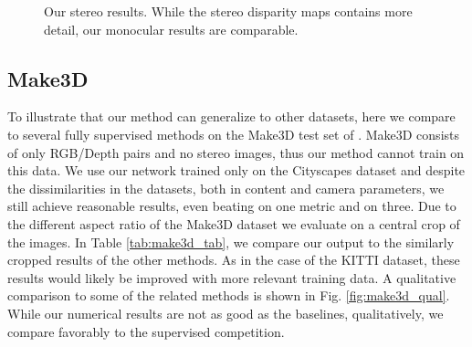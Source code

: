 \documentclass[10pt,twocolumn,letterpaper]{article}
\begin{document}
\begin{figure}[!ht]
  \centering
    \vspace{3pt}
  \caption{Our stereo results. While the stereo disparity maps contains more detail, our monocular results are comparable.}
  \label{fig:stereo_results}
  \vspace{-8pt}
\end{figure}

\subsection{Make3D} 
To illustrate that our method can generalize to other datasets, here we compare to several fully supervised methods on the Make3D test set of \cite{saxena2009make3d}. 
Make3D consists of only RGB/Depth pairs and no stereo images, thus our method cannot train on this data.
We use our network trained only on the Cityscapes dataset and despite the dissimilarities in the datasets, both in content and camera parameters, we still achieve reasonable results, even beating \cite{karsch2014depth} on one metric and \cite{liu2014discrete} on three.
Due to the different aspect ratio of the Make3D dataset we evaluate on a central crop of the images.
In Table \ref{tab:make3d_tab}, we compare our output to the similarly cropped results of the other methods.
As in the case of the KITTI dataset, these results would likely be improved with more relevant training data. 
A qualitative comparison to some of the related methods is shown in Fig. \ref{fig:make3d_qual}.
While our numerical results are not as good as the baselines, qualitatively, we compare favorably to the supervised competition.
\end{document}
